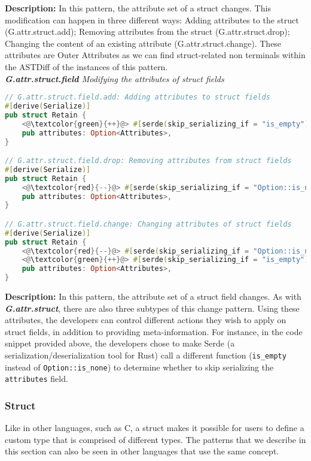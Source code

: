 \noindent\textbf{Description:} In this pattern, the attribute set of a struct changes. This modification can happen in three different ways: Adding attributes to the struct (G.attr.struct.add); Removing attributes from the struct (G.attr.struct.drop); Changing the content of an existing attribute (G.attr.struct.change). These attributes are Outer Attributes as we can find struct-related non terminals within the ASTDiff of the instances of this pattern. \\

\noindent\textit{\textbf{G.attr.struct.field} Modifying the attributes of struct fields}

\begin{lstlisting}[language=Rust, style=colouredRust]
// G.attr.struct.field.add: Adding attributes to struct fields
#[derive(Serialize)]
pub struct Retain {
    <@\textcolor{green}{++}@> #[serde(skip_serializing_if = "is_empty")]
    pub attributes: Option<Attributes>,
}

// G.attr.struct.field.drop: Removing attributes from struct fields
#[derive(Serialize)]
pub struct Retain {
    <@\textcolor{red}{--}@> #[serde(skip_serializing_if = "Option::is_none")]
    pub attributes: Option<Attributes>,
}

// G.attr.struct.field.change: Changing attributes of struct fields
#[derive(Serialize)]
pub struct Retain {
    <@\textcolor{red}{--}@> #[serde(skip_serializing_if = "Option::is_none")]
    <@\textcolor{green}{++}@> #[serde(skip_serializing_if = "is_empty")]
    pub attributes: Option<Attributes>,
}
\end{lstlisting}

\noindent\textbf{Description:} In this pattern, the attribute set of a struct field changes. As with \textit{\textbf{G.attr.struct}}, there are also three subtypes of this change pattern. Using these attributes, the developers can control different actions they wish to apply on struct fields, in addition to providing meta-information. For instance, in the code snippet provided above, the developers chose to make Serde (a serialization/deserialization tool for Rust) call a different function (\verb+is_empty+ instead of \verb+Option::is_none+) to determine whether to skip serializing the \verb+attributes+ field.


\subsubsection{Struct} 

Like in other languages, such as C, a struct makes it possible for users to define a custom type that is comprised of different types. The patterns that we describe in this section can also be seen in other languages that use the same concept. \\

